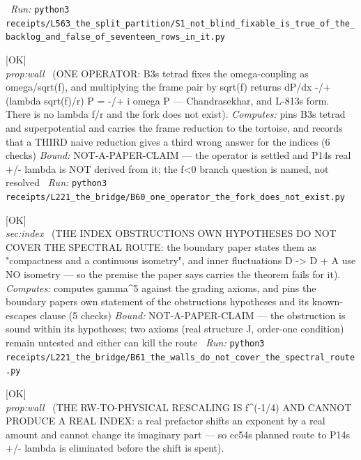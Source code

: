 \begin{description}
\ \emph{Run:} \texttt{python3 receipts/L563\_the\_split\_partition/S1\_not\_blind\_fixable\_is\_true\_of\_the\_backlog\_and\_false\_of\_seventeen\_rows\_in\_it.py}
\item[\label{rcpt:B60_one_operator_the_fork_does_not_exist}\texttt{B60\_one\_operator\_the\_fork\_does\_not\_exist}]\hfill\textsf{[OK]}\\
\textit{prop:wall} \ (ONE OPERATOR: B3s tetrad fixes the omega-coupling as omega/sqrt(f), and multiplying the frame pair by sqrt(f) returns dP/dx -/+ (lambda sqrt(f)/r) P = -/+ i omega P --- Chandrasekhar, and L-813s form. There is no lambda f/r and the fork does not exist). 
\emph{Computes:} pins B3s tetrad and superpotential and carries the frame reduction to the tortoise, and records that a THIRD naive reduction gives a third wrong answer for the indices (6 checks)
 \emph{Bound:} NOT-A-PAPER-CLAIM --- the operator is settled and P14s real +/- lambda is NOT derived from it; the f<0 branch question is named, not resolved
\ \emph{Run:} \texttt{python3 receipts/L221\_the\_bridge/B60\_one\_operator\_the\_fork\_does\_not\_exist.py}
\item[\label{rcpt:B61_the_walls_do_not_cover_the_spectral_route}\texttt{B61\_the\_walls\_do\_not\_cover\_the\_spectral\_route}]\hfill\textsf{[OK]}\\
\textit{sec:index} \ (THE INDEX OBSTRUCTIONS OWN HYPOTHESES DO NOT COVER THE SPECTRAL ROUTE: the boundary paper states them as "compactness and a continuous isometry", and inner fluctuations D -> D + A use NO isometry --- so the premise the paper says carries the theorem fails for it). 
\emph{Computes:} computes gamma\textasciicircum{}5 against the grading axioms, and pins the boundary papers own statement of the obstructions hypotheses and its known-escapes clause (5 checks)
 \emph{Bound:} NOT-A-PAPER-CLAIM --- the obstruction is sound within its hypotheses; two axioms (real structure J, order-one condition) remain untested and either can kill the route
\ \emph{Run:} \texttt{python3 receipts/L221\_the\_bridge/B61\_the\_walls\_do\_not\_cover\_the\_spectral\_route.py}
\item[\label{rcpt:B62_the_rescaling_cannot_make_an_index_real}\texttt{B62\_the\_rescaling\_cannot\_make\_an\_index\_real}]\hfill\textsf{[OK]}\\
\textit{prop:wall} \ (THE RW-TO-PHYSICAL RESCALING IS f\textasciicircum{}(-1/4) AND CANNOT PRODUCE A REAL INDEX: a real prefactor shifts an exponent by a real amount and cannot change its imaginary part --- so cc54s planned route to P14s +/- lambda is eliminated before the shift is spent). 

\end{description}
